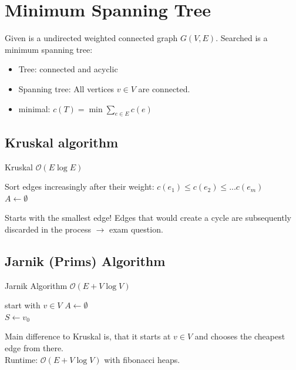 \documentclass[9pt,landscape,a4paper, table]{extarticle}
\begin{document}
\begin{multicols*}{3}
\begin{itemize}
\end{itemize}

\section{Minimum Spanning Tree}
Given is a undirected weighted connected graph $G(V,E)$. Searched is a minimum spanning tree:
\begin{itemize}
    \item Tree: connected and acyclic
    \item Spanning tree: All vertices $v \in V$ are connected.
    \item minimal: $c(T) = \min \sum_{e \in E} c(e)$
\end{itemize}
\subsection{Kruskal algorithm}

{\scriptsize
\begin{algorithm}[H]
    \caption{Kruskal $\mathcal{O}(E \log E)$}
    
    \SetAlgoLined
    Sort edges increasingly after their weight:
    $c(e_1) \leq c(e_2) \leq... c(e_m)$\\
    $A \leftarrow \emptyset$
\end{algorithm}}
Starts with the smallest edge! Edges that would create a cycle are subsequently discarded in the process $\rightarrow$ exam question.\\

\subsection{Jarnik (Prims) Algorithm}
{\scriptsize
\begin{algorithm}[H]
    \caption{Jarnik Algorithm $\mathcal{O}(E + V \log V)$}
    
    \SetAlgoLined
    start with $v \in V$
    $A \leftarrow \emptyset$\\
    $S \leftarrow {v_0}$
\end{algorithm}}
Main difference to Kruskal is, that it starts at $v \in V$ and chooses the cheapest edge from there.\\
Runtime: $\mathcal{O}(E + V \log V)$ with fibonacci heaps.

\end{multicols*}
\end{document}
